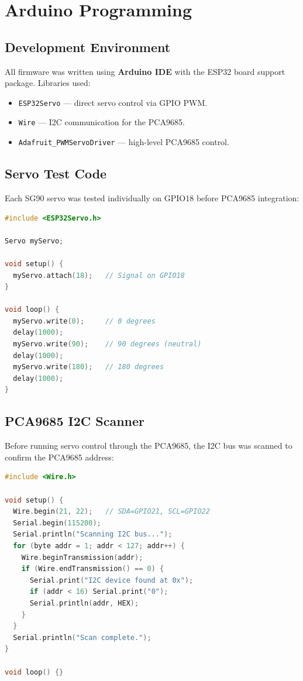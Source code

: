\documentclass[12pt, a4paper]{article}
\begin{document}
\section{Arduino Programming}

\subsection{Development Environment}

All firmware was written using \textbf{Arduino IDE} with the ESP32 board support
package. Libraries used:
\begin{itemize}[itemsep=3pt]
  \item \texttt{ESP32Servo} --- direct servo control via GPIO PWM.
  \item \texttt{Wire} --- I2C communication for the PCA9685.
  \item \texttt{Adafruit\_PWMServoDriver} --- high-level PCA9685 control.
\end{itemize}

\subsection{Servo Test Code}

Each SG90 servo was tested individually on GPIO18 before PCA9685 integration:

\begin{lstlisting}[language=C++, caption={Servo Test Code (ESP32 direct GPIO18)}, label={lst:servotest}]
#include <ESP32Servo.h>

Servo myServo;

void setup() {
  myServo.attach(18);   // Signal on GPIO18
}

void loop() {
  myServo.write(0);     // 0 degrees
  delay(1000);
  myServo.write(90);    // 90 degrees (neutral)
  delay(1000);
  myServo.write(180);   // 180 degrees
  delay(1000);
}
\end{lstlisting}

\subsection{PCA9685 I2C Scanner}

Before running servo control through the PCA9685, the I2C bus was scanned to
confirm the PCA9685 address:

\begin{lstlisting}[language=C++, caption={I2C Scanner --- PCA9685 Address Verification}, label={lst:i2cscan}]
#include <Wire.h>

void setup() {
  Wire.begin(21, 22);   // SDA=GPIO21, SCL=GPIO22
  Serial.begin(115200);
  Serial.println("Scanning I2C bus...");
  for (byte addr = 1; addr < 127; addr++) {
    Wire.beginTransmission(addr);
    if (Wire.endTransmission() == 0) {
      Serial.print("I2C device found at 0x");
      if (addr < 16) Serial.print("0");
      Serial.println(addr, HEX);
    }
  }
  Serial.println("Scan complete.");
}

void loop() {}
\end{lstlisting}
\end{document}
